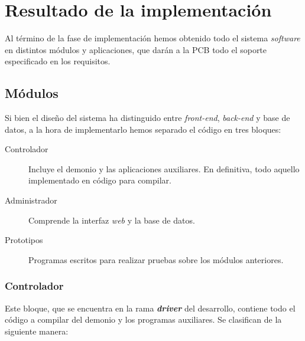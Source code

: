 \section{Resultado de la implementación}

Al término de la fase de implementación hemos obtenido todo el sistema \textit{software} en distintos módulos y aplicaciones, que darán a la \acrshort{PCB} todo el soporte especificado en los requisitos.

\subsection{Módulos}

Si bien el diseño del sistema ha distinguido entre \textit{front-end}, \textit{back-end} y base de datos, a la hora de implementarlo hemos separado el código en tres bloques:

\begin{description}
	\item[Controlador] Incluye el demonio y las aplicaciones auxiliares. En definitiva, todo aquello implementado en código para compilar.
	\item[Administrador] Comprende la interfaz \textit{web} y la base de datos.
	\item[Prototipos] Programas escritos para realizar pruebas sobre los módulos anteriores.
\end{description}

\subsubsection{Controlador}

Este bloque, que se encuentra en la rama \textbf{\textit{driver}} del desarrollo, contiene todo el código a compilar del demonio y los programas auxiliares. Se clasifican de la siguiente manera:

\smallskip

